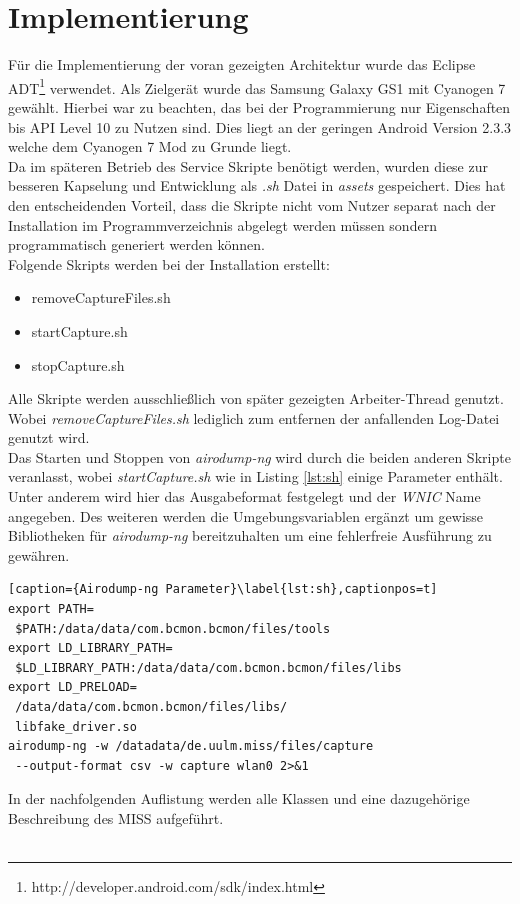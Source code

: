 \documentclass[]{report}
\begin{document}
\section{Implementierung}
Für die Implementierung der voran gezeigten Architektur wurde das Eclipse ADT\footnote{http://developer.android.com/sdk/index.html} verwendet. Als Zielgerät wurde das Samsung Galaxy GS1 mit Cyanogen 7 gewählt. Hierbei war zu beachten, das bei der Programmierung nur Eigenschaften bis API Level 10 zu Nutzen sind. Dies liegt an der geringen Android Version 2.3.3 welche dem Cyanogen 7 Mod zu Grunde liegt. \\
Da im späteren Betrieb des Service Skripte benötigt werden, wurden diese zur besseren Kapselung und Entwicklung als \textit{.sh} Datei in \textit{assets} gespeichert. Dies hat den entscheidenden Vorteil, dass die Skripte nicht vom Nutzer separat nach der Installation im Programmverzeichnis abgelegt werden müssen sondern programmatisch generiert werden können.\\
Folgende Skripts werden bei der Installation erstellt:
\begin{itemize}
\item removeCaptureFiles.sh
\item startCapture.sh
\item stopCapture.sh
\end{itemize}
Alle Skripte werden ausschließlich von später gezeigten Arbeiter-Thread genutzt. Wobei \textit{removeCaptureFiles.sh} lediglich zum entfernen der anfallenden Log-Datei genutzt wird. \\ Das Starten und Stoppen von \textit{airodump-ng} wird durch die beiden anderen Skripte veranlasst, wobei \textit{startCapture.sh} wie in Listing \ref{lst:sh} einige Parameter enthält. Unter anderem wird hier das Ausgabeformat festgelegt und der \textit{WNIC} Name angegeben. Des weiteren werden die Umgebungsvariablen ergänzt um gewisse Bibliotheken für \textit{airodump-ng} bereitzuhalten um eine fehlerfreie Ausführung zu gewähren.
\begin{lstlisting}[caption={Airodump-ng Parameter}\label{lst:sh},captionpos=t] 
export PATH=
 $PATH:/data/data/com.bcmon.bcmon/files/tools
export LD_LIBRARY_PATH=
 $LD_LIBRARY_PATH:/data/data/com.bcmon.bcmon/files/libs
export LD_PRELOAD=
 /data/data/com.bcmon.bcmon/files/libs/
 libfake_driver.so
airodump-ng -w /datadata/de.uulm.miss/files/capture 
 --output-format csv -w capture wlan0 2>&1
 \end{lstlisting}
In der nachfolgenden Auflistung werden alle Klassen und eine dazugehörige Beschreibung des MISS aufgeführt.\\ \\
\end{document}
